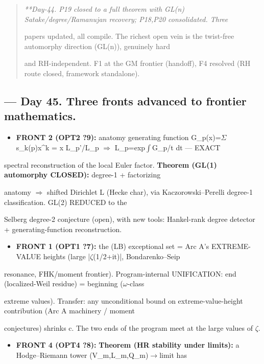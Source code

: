\documentclass[10pt]{article}
\begin{document}
\begin{quote}\itshape
**Day-44. P19 closed to a full theorem with GL(n) Satake/degree/Ramanujan recovery; P18,P20 consolidated. Three\par
papers updated, all compile. The richest open vein is the twist-free automorphy direction (GL(n)), genuinely hard\par
and RH-independent. F1 at the GM frontier (handoff), F4 resolved (RH route closed, framework standalone).\par
\end{quote}

\subsection*{ --- Day 45. Three fronts advanced to frontier mathematics.}
\begin{itemize}
\item \textbf{FRONT 2 (OPT2 ?9):} anatomy generating function G\_p(x)=\ensuremath{\Sigma} s\_k(p)x\textasciicircum{}k = x L\_p'/L\_p \ensuremath{\Rightarrow} L\_p=exp\ensuremath{\int}G\_p/t dt --- EXACT
\end{itemize}
  spectral reconstruction of the local Euler factor. \textbf{Theorem (GL(1) automorphy CLOSED):} degree-1 + factorizing\par
  anatomy \ensuremath{\Rightarrow} shifted Dirichlet L (Hecke char), via Kaczorowski--Perelli degree-1 classification. GL(2) REDUCED to the\par
  Selberg degree-2 conjecture (open), with new tools: Hankel-rank degree detector + generating-function reconstruction.\par
\begin{itemize}
\item \textbf{FRONT 1 (OPT1 ?7):} the (LB) exceptional set = Arc A's EXTREME-VALUE heights (large |\ensuremath{\zeta}(1/2+it)|, Bondarenko--Seip
\end{itemize}
  resonance, FHK/moment frontier). Program-internal UNIFICATION: end (localized-Weil residue) = beginning (\ensuremath{\omega}-class\par
  extreme values). Transfer: any unconditional bound on extreme-value-height contribution (Arc A machinery / moment\par
  conjectures) shrinks c. The two ends of the program meet at the large values of \ensuremath{\zeta}.\par
\begin{itemize}
\item \textbf{FRONT 4 (OPT4 ?8):} \textbf{Theorem (HR stability under limits):} a Hodge--Riemann tower (V\_m,L\_m,Q\_m)\ensuremath{\to}limit has
\end{itemize}
\end{document}
